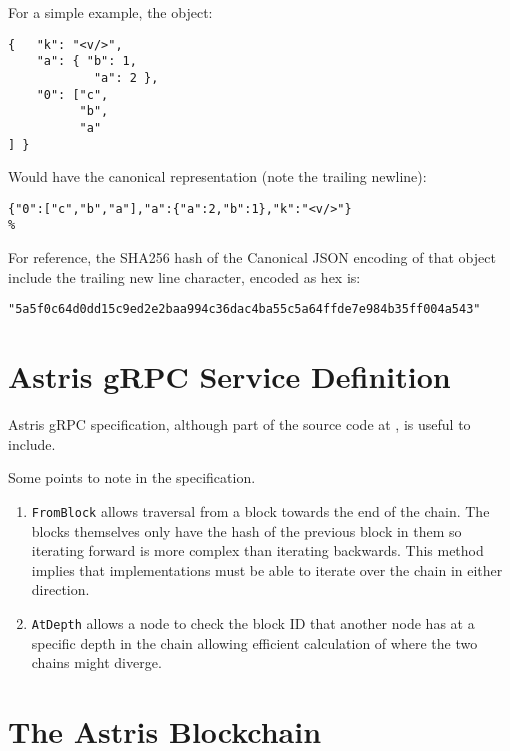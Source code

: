For a simple example, the object:

\newpage
\begin{lstlisting}[style=ES6]
{   "k": "<v/>",
    "a": { "b": 1,
            "a": 2 },
    "0": ["c",
          "b",
          "a"
] }
\end{lstlisting}

Would have the canonical representation (note the trailing newline):

\begin{lstlisting}[style=ES6,escapechar=\%]
{"0":["c","b","a"],"a":{"a":2,"b":1},"k":"<v/>"}
%
\end{lstlisting}

For reference, the SHA256 hash of the Canonical JSON encoding of that object include the trailing new line character, encoded as hex is:

\begin{lstlisting}[style=ES6]
"5a5f0c64d0dd15c9ed2e2baa994c36dac4ba55c5a64ffde7e984b35ff004a543"
\end{lstlisting}

\chapter{Astris gRPC Service Definition}
\label{appendix:grpc}

Astris gRPC specification, although part of the source code at {\surl{\astrisrepo}}, is useful to include.



Some points to note in the specification.

\begin{enumerate}
    \item \texttt{FromBlock} allows traversal from a block towards the end of the chain. The blocks themselves only have the hash of the previous block in them so iterating forward is more complex than iterating backwards. This method implies that implementations must be able to iterate over the chain in either direction.
    \item \texttt{AtDepth} allows a node to check the block ID that another node has at a specific depth in the chain allowing efficient calculation of where the two chains might diverge.
\end{enumerate}

\chapter{The Astris Blockchain}
\label{appendix:blockchain}

